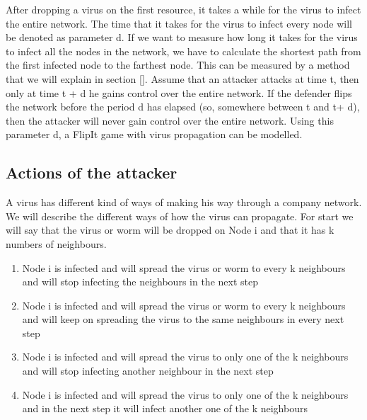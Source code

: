 After dropping a virus on the first resource, it takes a while for the virus to infect
the entire network. The time that it takes for the virus to infect every node will be
denoted as parameter d. If we want to measure how long it takes for the virus to
infect all the nodes in the network, we have to calculate the shortest path from the
first infected node to the farthest node. This can be measured by a method that we
will explain in section []. Assume that an attacker attacks at time t, then only at time t + d he gains control over the entire network. If the defender flips the network before the period d has elapsed (so, somewhere between t and t+ d), then the attacker will never gain control over the entire network. Using this parameter d, a FlipIt game with virus propagation
can be modelled. 

\subsection{Actions of the attacker}
A virus has different kind of ways of making his way through a company network. We will describe the different ways of how the virus can propagate. For start we will say that the virus or worm will be dropped on Node i and that it has k numbers of neighbours. 
\begin{enumerate}
\item Node i is infected and will spread the virus or worm to every k neighbours and will stop infecting the neighbours in the next step
\item Node i is infected and will spread the virus or worm to every k neighbours and will keep on spreading the virus to the same neighbours in every next step
\item Node i is infected and will spread the virus to only one of the k neighbours and will stop infecting another neighbour in the next step
\item Node i is infected and will spread the virus to only one of the k neighbours and in the next step it will infect another one of the k neighbours 
\end{enumerate}


